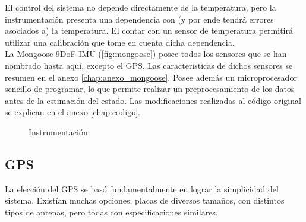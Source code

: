 \documentclass[main]{subfiles}
\begin{document}
El control del sistema no depende directamente de la temperatura, pero la instrumentaci\'on presenta una dependencia con (y por ende tendr\'a errores asociados a) la temperatura. El contar con un sensor de temperatura permitir\'a utilizar una calibraci\'on que tome en cuenta dicha dependencia.\\

La Mongoose 9DoF IMU (\ref{fig:mongoose}) posee todos los sensores que se han nombrado hasta aqu\'i, excepto el GPS. Las caracter\'isticas de dichos sensores se resumen en el anexo \ref{chap:anexo_mongoose}. Posee adem\'as un microprocesador sencillo de programar, lo que permite realizar un preprocesamiento de los datos antes de la estimaci\'on del estado. Las modificaciones realizadas al c\'odigo original se explican en el anexo \ref{chap:codigo}.

\begin{figure} 
  \vspace{-40pt}
  \centering
  \hspace{2cm}
  
  \caption{Instrumentaci\'on}
  \label{fig:intrumentacion}
\end{figure}

\subsection{GPS}

La elecci\'on del GPS se bas\'o fundamentalmente en lograr la simplicidad del sistema. Exist\'ian muchas opciones, placas de diversos tama\~nos, con distintos tipos de antenas, pero todas con especificaciones similares.\\
\end{document}
